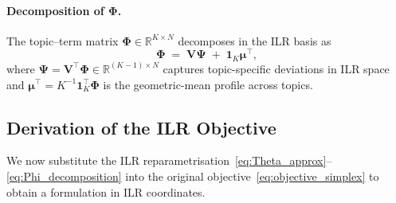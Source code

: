 \paragraph{Decomposition of $\boldsymbol{\Phi}$.}
The topic--term matrix $\boldsymbol{\Phi}\in\mathbb{R}^{K\times N}$
decomposes in the ILR basis as
\begin{equation}
  \boldsymbol{\Phi}
  \;=\;
  \mathbf{V}\boldsymbol{\Psi}
  \;+\;
  \mathbf{1}_K\boldsymbol{\mu}^{\!\top},
  \label{eq:Phi_decomposition}
\end{equation}
where
$\boldsymbol{\Psi}=\mathbf{V}^{\!\top}\boldsymbol{\Phi}
 \in\mathbb{R}^{(K{-}1)\times N}$
captures topic-specific deviations in ILR space and
$\boldsymbol{\mu}^{\!\top}=K^{-1}\mathbf{1}_K^{\!\top}\boldsymbol{\Phi}$
is the geometric-mean profile across topics.


\subsection{Derivation of the ILR Objective}
\label{subsec:ilr_derivation}

We now substitute the ILR
reparametrisation~\eqref{eq:Theta_approx}--\eqref{eq:Phi_decomposition}
into the original objective~\eqref{eq:objective_simplex} to obtain a
formulation in ILR coordinates.

